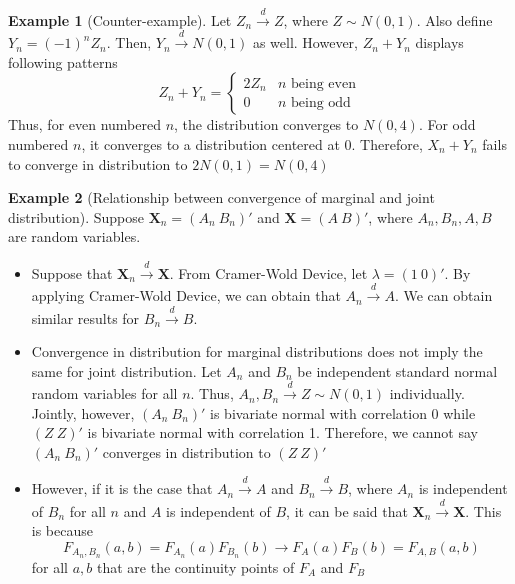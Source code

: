 \documentclass[12pt]{article}
\theoremstyle{definition}
\theoremstyle{property}
\theoremstyle{example}
\newtheorem{example}{Example}[section]
\begin{document}
\begin{mdframed}[backgroundcolor=yellow!5] 

\begin{example}[Counter-example]
Let $Z_n\xrightarrow{d}Z$, where $Z\sim N(0,1)$. Also define $Y_n = (-1)^nZ_n$. Then, $Y_n\xrightarrow{d} N(0,1)$ as well. However, $Z_n+Y_n$ displays following patterns
\small{\[
Z_n+Y_n = \begin{cases} 2Z_n & n\text{ being even} \\ 0& n\text{ being odd}\end{cases}
\]}\normalsize
Thus, for even numbered $n$, the distribution converges to $N(0,4)$. For odd numbered $n$, it converges to a distribution centered at 0. Therefore, $X_n+Y_n$ fails to converge in distribution to $2N(0,1)=N(0,4)$
\end{example}
\begin{example}[Relationship between convergence of marginal and joint distribution]
Suppose $\mathbf{X}_n=( A_n\  B_n)'$ and $\mathbf{X}=( A\ B)'$, where $A_n, B_n, A, B$ are random variables. 
\begin{itemize}
\item Suppose that $\mathbf{X}_n\xrightarrow{d} \mathbf{X}$.  From Cramer-Wold Device, let $\lambda=(1 \ 0)'$. By applying Cramer-Wold Device, we can obtain that $A_n\xrightarrow{d}A$. We can obtain similar results for $B_n\xrightarrow{d}B$. 
\item Convergence in distribution for marginal distributions does not imply the same for joint distribution. Let $A_n$ and $B_n$ be independent standard normal random variables for all $n$. Thus, $A_n,B_n\xrightarrow{d}Z\sim N(0,1)$ individually. Jointly, however, $(A_n \ B_n)'$ is bivariate normal with correlation 0 while $(Z \ Z)'$ is bivariate normal with correlation 1. Therefore, we cannot say $(A_n \ B_n)'$ converges in distribution to $(Z \ Z)'$
\item However, if it is the case that $A_n\xrightarrow{d}A$ and $B_n\xrightarrow{d}B$, where $A_n$ is independent of $B_n$ for all $n$ and $A$ is independent of $B$, it can be said that $\mathbf{X}_n\xrightarrow{d}\mathbf{X}$. This is because
\small{\[
F_{A_n,B_n}(a,b)=F_{A_n}(a)F_{B_n}(b)\to F_A(a)F_B(b)=F_{A,B}(a,b)
\]}\normalsize for all $a,b$ that are the continuity points of $F_A$ and $F_B$
\end{itemize}
\end{example}
\end{mdframed}\par
\end{document}
